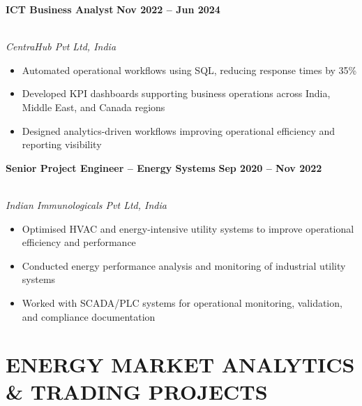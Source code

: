 \documentclass[10pt,a4paper]{article}
\begin{document}
\vspace{5pt}

\textbf{\color{Secondary} ICT Business Analyst}
\hfill
{\color{Primary}\textbf{Nov 2022 -- Jun 2024}}

\\
\textit{CentraHub Pvt Ltd, India}

\vspace{3pt}

\begin{itemize}
\item Automated operational workflows using SQL, reducing response times by 35\%
\item Developed KPI dashboards supporting business operations across India, Middle East, and Canada regions
\item Designed analytics-driven workflows improving operational efficiency and reporting visibility
\end{itemize}

\vspace{6pt}

\textbf{\color{Secondary} Senior Project Engineer -- Energy Systems}
\hfill
{\color{Primary}\textbf{Sep 2020 -- Nov 2022}}

\\
\textit{Indian Immunologicals Pvt Ltd, India}

\vspace{3pt}

\begin{itemize}
\item Optimised HVAC and energy-intensive utility systems to improve operational efficiency and performance
\item Conducted energy performance analysis and monitoring of industrial utility systems
\item Worked with SCADA/PLC systems for operational monitoring, validation, and compliance documentation
\end{itemize}


\section{ENERGY MARKET ANALYTICS \& TRADING PROJECTS}
\end{document}

